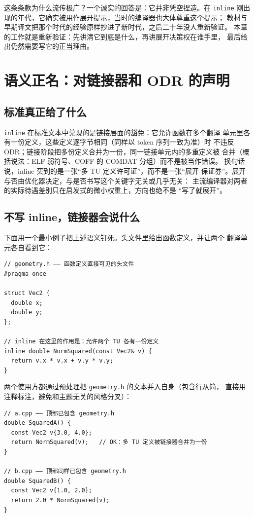 \documentclass[12pt,a4paper,fontset=fandol]{ctexbook}
\newcommand{\Tp}[1]{\texttt{#1}}
\begin{document}
这条条款为什么流传极广？一个诚实的回答是：它并非凭空捏造。在 \Tp{inline}
刚出现的年代，它确实被用作展开提示，当时的编译器也大体尊重这个提示；
教材与早期译文把那个时代的经验原样抄进了新时代，之后二十年没人重新验证。
本章的工作就是重新验证：先讲清它到底是什么，再讲展开决策权在谁手里，
最后给出仍然需要写它的正当理由。

\section{语义正名：对链接器和 ODR 的声明}
\label{sec:ch08-semantics}

\subsection{标准真正给了什么}
\label{sec:ch08-odr}

\Tp{inline} 在标准文本中兑现的是链接层面的豁免：它允许函数在多个翻译
单元里各有一份定义，这些定义逐字节相同（同样以 token 序列一致为准）时
不违反 ODR；链接阶段把多份定义合并为一份，同一链接单元内的多重定义被
合并（概括说法：ELF 弱符号、COFF 的 COMDAT 分组）而不是被当作错误。
换句话说，inline 买到的是一张``多 TU 定义许可证''，而不是一张``展开
保证券''。展开与否由优化器决定，与是否书写这个关键字无关或几乎无关：
主流编译器对两者的实际待遇差别只在启发式的微小权重上，方向也绝不是
``写了就展开''。

\subsection{不写 inline，链接器会说什么}
\label{sec:ch08-odrdemo}

下面用一个最小例子把上述语义钉死。头文件里给出函数定义，并让两个
翻译单元各自看到它：

\begin{lstlisting}[style=cppstyle]
// geometry.h —— 函数定义直接可见的头文件
#pragma once

struct Vec2 {
  double x;
  double y;
};

// inline 在这里的作用是：允许两个 TU 各有一份定义
inline double NormSquared(const Vec2& v) {
  return v.x * v.x + v.y * v.y;
}
\end{lstlisting}

两个使用方都通过预处理把 \Tp{geometry.h} 的文本并入自身（包含行从简，
直接用注释标注，避免和主题无关的风格分叉）：

\begin{lstlisting}[style=cppstyle]
// a.cpp —— 顶部已包含 geometry.h
double SquaredA() {
  const Vec2 v{3.0, 4.0};
  return NormSquared(v);   // OK：多 TU 定义被链接器合并为一份
}

// b.cpp —— 顶部同样已包含 geometry.h
double SquaredB() {
  const Vec2 v{1.0, 2.0};
  return 2.0 * NormSquared(v);
}
\end{lstlisting}
\end{document}
